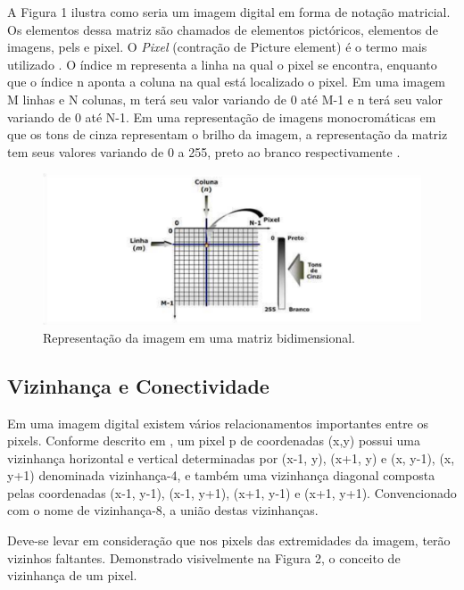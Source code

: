 A Figura 1 ilustra como seria um imagem digital em forma de notação matricial. Os elementos dessa matriz são chamados de elementos pictóricos, elementos de imagens, pels e pixel. O \textit{Pixel} (contração de Picture element) é o termo mais utilizado \cite{GONZALEZ2006}. O índice m representa a linha na qual o pixel se encontra, enquanto que o índice n aponta a coluna na qual está localizado o pixel. Em uma imagem M linhas e N colunas, m terá seu valor variando de 0 até M-1 e n terá seu valor variando de 0 até N-1. Em uma representação de imagens monocromáticas em que os tons de cinza representam o brilho da imagem, a representação da matriz tem seus valores variando de 0 a 255, preto ao branco respectivamente \cite{Almeida2018}. 

 \begin{figure}[htb]
	\centering
	\includegraphics[width=1.0\textwidth]{Imagens/imagem1} 
	\caption[Texto que vai aparecer na lista de fig.]{Representação da imagem em uma matriz bidimensional.}
	\label{fig:tux_laplace}
\end{figure}


\subsection{Vizinhança e Conectividade}
Em uma imagem digital existem vários relacionamentos importantes entre os pixels. Conforme descrito em , 
um pixel p de coordenadas (x,y) possui uma vizinhança horizontal e vertical determinadas por (x-1, y), (x+1, y) e (x, y-1), (x, y+1) denominada vizinhança-4, e também uma vizinhança diagonal composta pelas coordenadas (x-1, y-1), (x-1, y+1), (x+1, y-1) e (x+1, y+1). Convencionado com o nome de vizinhança-8, a união destas vizinhanças.

Deve-se levar em consideração que nos pixels das extremidades da imagem, terão vizinhos faltantes. Demonstrado visivelmente na Figura 2, o conceito de vizinhança de um pixel.


